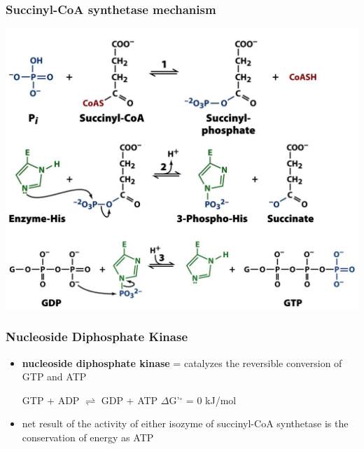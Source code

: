\documentclass[10pt]{article}
\begin{document}
\subsubsection*{Succinyl-CoA synthetase mechanism}
\begin{center} 
    \includegraphics*[width=\textwidth]{L4_13.png} 
\end{center}

\subsubsection*{Nucleoside Diphosphate Kinase}
\begin{itemize}
	\item \textbf{nucleoside diphosphate kinase} = catalyzes the reversible conversion of GTP and ATP
	\begin{center} 
        GTP + ADP $\rightleftharpoons$ GDP + ATP \hspace{1.2cm} $\Delta$G'$^\circ$ = 0 kJ/mol
    \end{center}
    \item net result of the activity of either isozyme of succinyl-CoA synthetase is the conservation of energy as ATP
\end{itemize}
\end{document}
